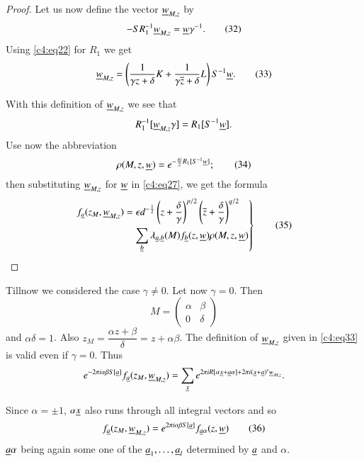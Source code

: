 \begin{proof}
Let us now define the vector $\underline{w}_{M,z}$ by
\begin{equation*}
-SR^{-1}_{1}\underline{w}_{M,z}=\underline{w}\gamma^{-1}.\tag{32}\label{c4:eq32}
\end{equation*}
Using \eqref{c4:eq22} for $R_{1}$ we get
\begin{equation*}
\underline{w}_{M,z} = \left(\frac{1}{\gamma z+\delta} K +
\frac{1}{\gamma \overline{z}+\delta} L\right)S^{-1}\underline{w}.\tag{33}\label{c4:eq33} 
\end{equation*}

With this definition of $\underline{w}_{M,z}$ we see that
$$
R^{-1}_{1}[\underline{w}_{M,z}\gamma]=R_{1}[S^{-1}\underline{w}].
$$
Use now the abbreviation
\begin{equation*}
\rho(M,z,\underline{w})=e^{-\frac{\pi i}{2}R_{1}[S^{-1}\underline{w}]};\tag{34}\label{c4:eq34}
\end{equation*}
then substituting $\underline{w}_{M,z}$ for $\underline{w}$ in \eqref{c4:eq27}, we get
the formula
\begin{equation*}
\left.
\begin{aligned}
f_{\underline{a}}(z_{M},\underline{w}_{M,z}) &= \epsilon
d^{-\frac{1}{2}}\left(z+\frac{\delta}{\gamma}\right)^{p/2}\left(\overline{z}+\frac{\delta}{\gamma}\right)^{q/2}\\ 
&\quad
\sum_{\underline{b}}\lambda_{\underline{a},\underline{b}}(M)f_{\underline{b}}(z,\underline{w})\rho(M,z,\underline{w}) 
\end{aligned}
\right\}\tag{35}\label{c4:eq35}
\end{equation*}
\end{proof}

Till\pageoriginale now we considered the case $\gamma\neq 0$. Let now
$\gamma=0$. Then
$$
M=
\begin{pmatrix}
\alpha & \beta\\
0 & \delta
\end{pmatrix}
$$
and $\alpha\delta=1$. Also $z_{M}=\dfrac{\alpha
  z+\beta}{\delta}=z+\alpha\beta$. The definition of $\underline{w}_{M,z}$
given in \eqref{c4:eq33} is valid even if $\gamma=0$. Thus
$$
e^{-2\pi i\alpha\beta
  S[\underline{a}]}f_{\underline{a}}(z_{M},\underline{w}_{M,z})=\sum_{\underline{x}}e^{2\pi
  iR[\alpha\underline{x}+\underline{a}\alpha]+2\pi i(\underline{x}+\underline{a})'\underline{w}_{M,z}}.
$$

Since $\alpha=\pm 1$, $\alpha \underline{x}$ also runs through all integral
vectors and so
\begin{equation*}
f_{\underline{a}}(z_{M},\underline{w}_{M,z})=e^{2\pi i\alpha\beta
  S[\underline{a}]}f_{\underline{a}\alpha}(z,\underline{w})\tag{36}\label{c4:eq36} 
\end{equation*}
$\underline{a}\alpha$ being again some one of the
$\underline{a}_{1},\ldots,\underline{a}_{l}$ determined by $\underline{a}$ and $\alpha$.

